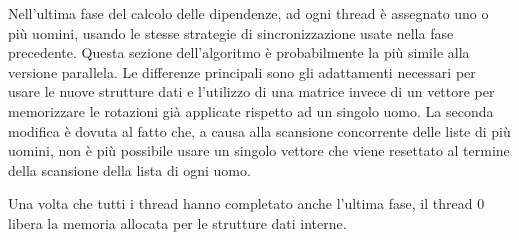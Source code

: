 \documentclass[12pt]{article}
\begin{document}
    Nell'ultima fase del calcolo delle dipendenze, ad ogni thread è assegnato uno o più uomini, usando le stesse strategie di sincronizzazione usate nella fase precedente. Questa sezione dell'algoritmo è probabilmente la più simile alla versione parallela. Le differenze principali sono gli adattamenti necessari per usare le nuove strutture dati e l'utilizzo di una matrice invece di un vettore per memorizzare le rotazioni già applicate rispetto ad un singolo uomo. La seconda modifica è dovuta al fatto che, a causa alla scansione concorrente delle liste di più uomini, non è più possibile usare un singolo vettore che viene resettato al termine della scansione della lista di ogni uomo.

    Una volta che tutti i thread hanno completato anche l'ultima fase, il thread 0 libera la memoria allocata per le strutture dati interne.
    
\end{document}
